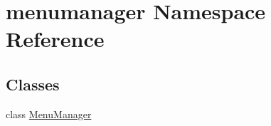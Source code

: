 \hypertarget{namespacemenumanager}{}\section{menumanager Namespace Reference}
\label{namespacemenumanager}
\subsection*{Classes}
\begin{DoxyCompactItemize}
\item 
class \hyperlink{classmenumanager_1_1MenuManager}{Menu\+Manager}
\end{DoxyCompactItemize}
